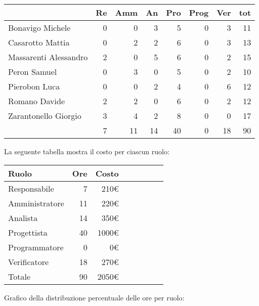 \begin{table}[H]
    \begin{tabularx}{\linewidth}{X|rrrrrrr}
    \rowcolor{gray!30}& Re & Amm & An & Pro & Prog & Ver & tot \\
    \hline
    Bonavigo Michele                        & 0 & 0 & 3 & 5 & 0 & 3 & 11 \\
    \rowcolor{gray!10}Casarotto Mattia      & 0 & 2 & 2 & 6 & 0 & 3 & 13 \\
    Massarenti Alessandro                   & 2 & 0 & 5 & 6 & 0 & 2 & 15 \\
    \rowcolor{gray!10}Peron Samuel          & 0 & 3 & 0 & 5 & 0 & 2 & 10 \\
    Pierobon Luca                           & 0 & 0 & 2 & 4 & 0 & 6 & 12 \\
    \rowcolor{gray!10}Romano Davide         & 2 & 2 & 0 & 6 & 0 & 2 & 12 \\
    Zarantonello Giorgio                    & 3 & 4 & 2 & 8 & 0 & 0 & 17 \\
    \hline                                  & 7 & 11 & 14 & 40 & 0 & 18 & 90 \\ 
    \end{tabularx}
\end{table}

La seguente tabella mostra il costo per ciascun ruolo:
\begin{table}[H]
    \begin{tabularx}{\linewidth}{X|rrrrrrr}
    \rowcolor{gray!30}Ruolo & Ore & Costo \\
    \hline
    Responsabile                            & 7 & 210€ \\
    \rowcolor{gray!10}Amministratore        & 11 & 220€ \\
    Analista                                & 14 & 350€ \\
    \rowcolor{gray!10}Progettista           & 40 & 1000€ \\
    Programmatore                           & 0 & 0€ \\
    \rowcolor{gray!10}Verificatore          & 18 & 270€ \\
    \hline Totale                           & 90 & 2050€ \\ 
    \end{tabularx}
\end{table}

Grafico della distribuzione percentuale delle ore per ruolo:
\begin{center}
\end{center}

